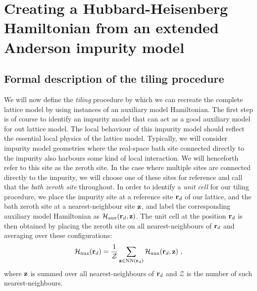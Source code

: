 \documentclass[reprint,hidelinks]{revtex4-2}
\begin{document}
\section{Creating a Hubbard-Heisenberg Hamiltonian from an extended Anderson impurity model}

\subsection{Formal description of the tiling procedure}
We will now define the {\it tiling} procedure by which we can recreate the complete lattice model by using instances of an auxiliary model Hamiltonian. The first step is of course to identify an impurity model that can act as a good auxiliary model for out lattice model. The local behaviour of this impurity model should reflect the essential local physics of the lattice model. Typically, we will consider impurity model geometries where the real-space bath site connected directly to the impurity also harbours some kind of local interaction. We will henceforth refer to this site as the zeroth site. In the case where multiple sites are connected directly to the impurity, we will choose one of these sites for reference and call that the {\it bath zeroth site} throughout. In order to identify a {\it unit cell} for our tiling procedure, we place the impurity site at a reference site \({\bf r}_d\) of our lattice, and the bath zeroth site at a nearest-neighbour site \({\bf z}\), and label the corresponding auxiliary model Hamiltonian as \(\mathcal{H}_\text{aux}({\bf r}_d, {\bf z})\). The unit cell at the position \({\bf r}_d\) is then obtained by placing the zeroth site on all nearest-neighbours of \({\bf r}_d\) and averaging over these configurations:
\begin{equation}\begin{aligned}\label{unitCellHamiltonian}
	\mathcal{H}_\text{aux}({\bf r}_d) = \frac{1}{\mathcal{Z}}\sum_{{\bf z}\in\text{NN}({\bf r}_d)}\mathcal{H}_\text{aux}({\bf r}_d, {\bf z})~,
\end{aligned}\end{equation}
where \({\bf z}\) is summed over all nearest-neighbours of \({\bf r}_d\) and \(\mathcal{Z}\) is the number of such nearest-neighbours.
\end{document}
